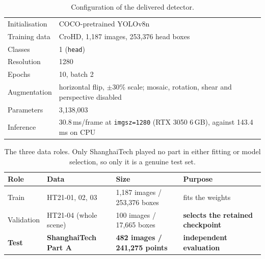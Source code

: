 \begin{table}[t]
  \centering
  \caption{Configuration of the delivered detector.}
  \label{tab:delivered-model}
  \begin{tabularx}{\linewidth}{@{}lX@{}}
    \toprule
    Initialisation & COCO-pretrained YOLOv8n \\
    Training data  & CroHD, 1{,}187 images, 253{,}376 head boxes \\
    Classes        & 1 (\texttt{head}) \\
    Resolution     & 1280 \\
    Epochs         & 10, batch 2 \\
    Augmentation   & horizontal flip, $\pm$30\% scale; mosaic, rotation, shear
                     and perspective disabled \\
    Parameters     & 3{,}138{,}003 \\
    Inference      & 30.8\,ms/frame at \texttt{imgsz=1280} (RTX 3050 6\,GB),
                     against 143.4\,ms on CPU \\
    \bottomrule
  \end{tabularx}
\end{table}


\begin{table}[t]
  \centering
  \caption{The three data roles. Only ShanghaiTech played no part in either
           fitting or model selection, so only it is a genuine test set.}
  \label{tab:split}
  \begin{tabularx}{\linewidth}{@{}L{0.60}L{0.95}L{1.20}L{1.25}@{}}
    \toprule
    \textbf{Role} & \textbf{Data} & \textbf{Size} & \textbf{Purpose} \\
    \midrule
    Train
      & HT21-01, 02, 03
      & 1{,}187 images / 253{,}376 boxes
      & fits the weights \\
    Validation
      & HT21-04 (whole scene)
      & 100 images / 17{,}665 boxes
      & \textbf{selects the retained checkpoint} \\
    \textbf{Test}
      & \textbf{ShanghaiTech Part A}
      & \textbf{482 images / 241{,}275 points}
      & \textbf{independent evaluation} \\
    \bottomrule
  \end{tabularx}
\end{table}


